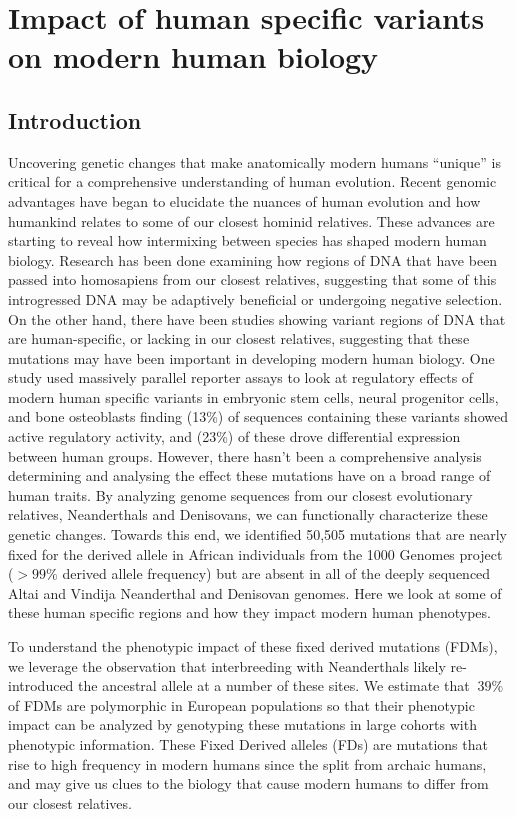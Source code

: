 \chapter{Impact of human specific variants on modern human biology}
\section{Introduction}
Uncovering genetic changes that make anatomically modern humans “unique” is critical for a comprehensive understanding of human evolution. Recent genomic advantages have began to elucidate the nuances of human evolution and how humankind relates to some of our closest hominid relatives. These advances are starting to reveal how intermixing between species has shaped modern human biology. Research has been done examining how regions of DNA that have been passed into homosapiens from our closest relatives, suggesting that some of this introgressed DNA may be adaptively beneficial or undergoing negative selection. On the other hand, there have been studies showing variant regions of DNA that are human-specific, or lacking in our closest relatives, suggesting that these mutations may have been important in developing modern human biology. 
One study used massively parallel reporter assays to look at regulatory effects of modern human specific variants \cite{weiss2021cis} in embryonic stem cells, neural progenitor cells, and bone osteoblasts finding (13\%) of sequences containing these variants showed active regulatory activity, and (23\%) of these drove differential expression between human groups. However, there hasn't been a comprehensive analysis determining and analysing the effect these mutations have on a broad range of human traits.
By analyzing genome sequences from our closest evolutionary relatives, Neanderthals and Denisovans, we can functionally characterize these genetic changes. Towards this end, we identified 50,505 mutations that are nearly fixed for the derived allele in African individuals from the 1000 Genomes project ($>99\%$ derived allele frequency) but are absent in all of the deeply sequenced Altai and Vindija Neanderthal and Denisovan genomes. Here we look at some of these human specific regions and how they impact modern human phenotypes.

To understand the phenotypic impact of these fixed derived mutations (FDMs), we leverage the observation that interbreeding with Neanderthals likely re-introduced the ancestral allele at a number of these sites. We estimate that $~39\%$ of FDMs are polymorphic in European populations so that their phenotypic impact can be analyzed by genotyping these mutations in large cohorts with phenotypic information. These Fixed Derived alleles (FDs) are mutations that rise to high frequency  in  modern  humans  since  the  split  from  archaic humans, and may give us clues to the biology that cause modern humans to differ from our closest relatives.
